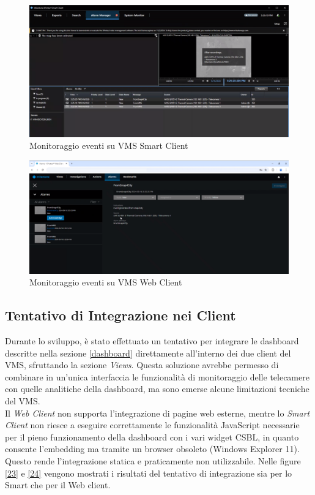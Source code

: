 \documentclass[a4paper, openright, thesis]{report}
\begin{document}
\begin{figure}[H]
    \centering
    \includegraphics[width=1\textwidth]{img/alarm_client.png}
    \caption{Monitoraggio eventi su VMS Smart Client}
    \label{21}
\end{figure}
\begin{figure}[H]
    \centering
    \includegraphics[width=1\textwidth]{img/alarm_client_web.png}
    \caption{Monitoraggio eventi su VMS Web Client}
    \label{22}
\end{figure}


\subsection{Tentativo di Integrazione nei Client}

Durante lo sviluppo, è stato effettuato un tentativo per integrare le dashboard descritte nella sezione \ref{dashboard} direttamente all'interno dei due client del VMS, sfruttando la sezione \textit{Views}. Questa soluzione avrebbe permesso di combinare in un'unica interfaccia le funzionalità di monitoraggio delle telecamere con quelle analitiche della dashboard, ma sono emerse alcune limitazioni tecniche del VMS. \\
Il \textit{Web Client} non supporta l'integrazione di pagine web esterne, mentre lo \textit{Smart Client} non riesce a eseguire correttamente le funzionalità JavaScript necessarie per il pieno funzionamento della dashboard con i vari widget CSBL, in quanto consente l'embedding ma tramite un browser obsoleto (Windows Explorer 11). Questo rende l'integrazione statica e praticamente non utilizzabile.
Nelle figure \ref{23} e \ref{24} vengono mostrati i risultati del tentativo di integrazione sia per lo Smart che per il Web client.
\end{document}
